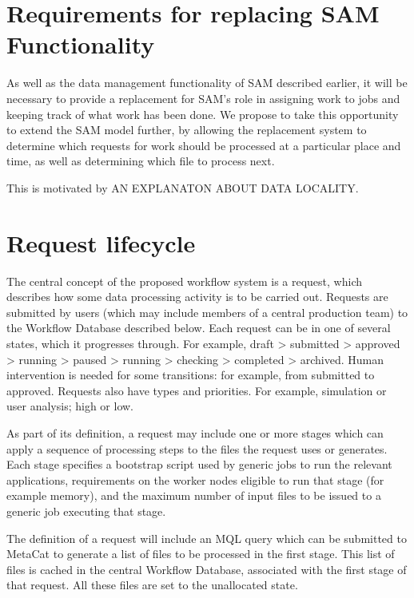 \documentclass[../main-v1.tex]{subfiles}
\begin{document}
\section{Requirements for replacing SAM Functionality}

As well as the data management functionality of SAM described earlier, it will be necessary to provide a replacement for SAM's role in assigning work to jobs and keeping track of what work has been done. We propose to take this opportunity to extend the SAM model further, by allowing the replacement system to determine which requests for work should be processed at a particular place and time, as well as determining which file to process next.

This is motivated by AN EXPLANATON ABOUT DATA LOCALITY.

\section{Request lifecycle }
\label{sec:flow:lifecycle}

The central concept of the proposed workflow system is a request, which describes how some data processing activity is to be carried out. Requests are submitted by users (which may include members of a central production team) to the Workflow Database described below. Each request can be in one of several states, which it progresses through. For example, draft > submitted > approved > running > paused > running > checking > completed > archived. Human intervention is needed for some transitions: for example, from submitted to approved. Requests also have types and priorities. For example, simulation or user analysis; high or low.

As part of its definition, a request may include one or more stages which can apply a sequence of processing steps to the files the request uses or generates. Each stage specifies a bootstrap script used by generic jobs to run the relevant applications, requirements on the worker nodes eligible to run that stage (for example memory), and the maximum number of input files to be issued to a generic job executing that stage.

The definition of a request will include an MQL query which can be submitted to MetaCat to generate a list of files to be processed in the first stage. This list of files is cached in the central Workflow Database, associated with the first stage of that request. All these files are set to the unallocated state. 
\end{document}
